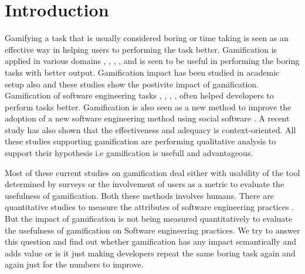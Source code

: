 \documentclass[conference]{IEEEtran}
\begin{document}




%


\section{Introduction}

Gamifying\cite{Deterding2011} \cite{Sebastian2011} a task that is usually considered boring or time taking is seen as an effective way in helping users to performing the task better. Gamification is applied in various domains \cite{Rojas2014}, \cite{Herzig2012}, \cite{Uskov2014}, \cite{Pedreira2015}, \cite{Villagrasa2014} and is seen to be useful in performing the boring tasks with better output. Gamification impact has been studied in academic setup also \cite{Hakulinen2014} \cite{Hakulinen2013}and these studies show the postivite impact of gamification. Gamification of software engineering tasks \cite{Singer2012}, \cite{Biegel2014}, \cite{Tillmann2013}, \cite{Prause2015}, \cite{Phillip2011} often helped developers to perform tasks better. Gamification is also seen as a new method to improve the adoption of a new software engineering method using social software \cite{Schneider2012}. A recent study \cite{Marder2015} has also shown that the effectiveness and adequacy is context-oriented.  All these studies supporting gamification are performing qualitative analysis to support their hypothesis i.e gamification is usefull and advantageous. 

Most of these current studies on gamification deal either with usability of the tool determined by surveys or the involvement of users as a metric to evaluate the usefulness of gamification. Both these methods involves humans. There are quantitative studies to measure the attributes of software engineering practices \cite{Bosu2015}. But the impact of gamification is not being measured quantitatively to evaluate the usefulness of gamification on Software engineering practices. We try to answer this question and find out whether gamification has any impact semantically and adds value or is it just making developers repeat the same boring task again and again just for the numbers to improve. 
\end{document}
